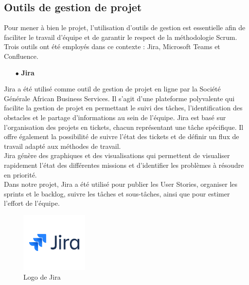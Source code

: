 \subsection{Outils de gestion de projet}

Pour mener à bien le projet, l'utilisation d'outils de gestion est essentielle afin de faciliter le travail d'équipe et de garantir le respect de la méthodologie Scrum. Trois outils ont été employés dans ce contexte : Jira, Microsoft Teams et Confluence.

\begin{itemize}
\item[$\bullet$] \textbf{Jira}
\end{itemize}
Jira a été utilisé comme outil de gestion de projet en ligne par la Société Générale African Business Services. Il s'agit d'une plateforme polyvalente qui facilite la gestion de projet en permettant le suivi des tâches, l'identification des obstacles et le partage d'informations au sein de l'équipe. Jira est basé sur l'organisation des projets en tickets, chacun représentant une tâche spécifique. Il offre également la possibilité de suivre l'état des tickets et de définir un flux de travail adapté aux méthodes de travail.\\
Jira génère des graphiques et des visualisations qui permettent de visualiser rapidement l'état des différentes missions et d'identifier les problèmes à résoudre en priorité.\\
Dans notre projet, Jira a été utilisé pour publier les User Stories, organiser les sprints et le backlog, suivre les tâches et sous-tâches, ainsi que pour estimer l'effort de l'équipe.
\begin{figure}[!h]
    \centering %
        \includegraphics[height=3cm]{images/logos/jira.png}
    \caption{Logo de Jira}
\end{figure}

